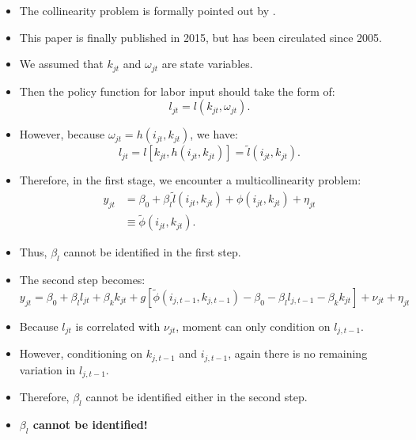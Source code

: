 \documentclass[
]{book}
\providecommand{\tightlist}{%
  \setlength{\itemsep}{0pt}\setlength{\parskip}{0pt}}
\begin{document}
\begin{itemize}
\tightlist
\item
  The collinearity problem is formally pointed out by \citet{Ackerberg2015}.
\item
  This paper is finally published in 2015, but has been circulated since 2005.
\item
  We assumed that \(k_{jt}\) and \(\omega_{jt}\) are state variables.
\item
  Then the policy function for labor input should take the form of:
  \begin{equation}
  l_{jt} = l(k_{jt}, \omega_{jt}).
  \end{equation}
\item
  However, because \(\omega_{jt} = h(i_{jt}, k_{jt})\), we have:
  \begin{equation}
  l_{jt} = l[k_{jt}, h(i_{jt}, k_{jt})] = \tilde{l}(i_{jt}, k_{jt}).
  \end{equation}
\item
  Therefore, in the first stage, we encounter a multicollinearity problem:
  \begin{equation}
  \begin{split}
  y_{jt} &= \beta_0 + \beta_l \tilde{l}(i_{jt}, k_{jt}) + \phi(i_{jt}, k_{jt}) + \eta_{jt}\\
  &\equiv \tilde{\phi}(i_{jt}, k_{jt}).
  \end{split}
  \end{equation}
\item
  Thus, \(\beta_l\) cannot be identified in the first step.
\item
  The second step becomes:
  \begin{equation}
  y_{jt} = \beta_0 + \beta_l l_{jt} + \beta_k k_{jt} + g[\tilde{\phi}(i_{j, t - 1}, k_{j, t - 1}) - \beta_0 - \beta_l l_{j, t - 1} - \beta_k k_{jt}] + \nu_{jt} + \eta_{jt}
  \end{equation}
\item
  Because \(l_{jt}\) is correlated with \(\nu_{jt}\), moment can only condition on \(l_{j, t - 1}\).
\item
  However, conditioning on \(k_{j, t - 1}\) and \(i_{j, t - 1}\), again there is no remaining variation in \(l_{j, t - 1}\).
\item
  Therefore, \(\beta_l\) cannot be identified either in the second step.
\item
  \textbf{\(\beta_l\) cannot be identified!}
\end{itemize}
\end{document}
